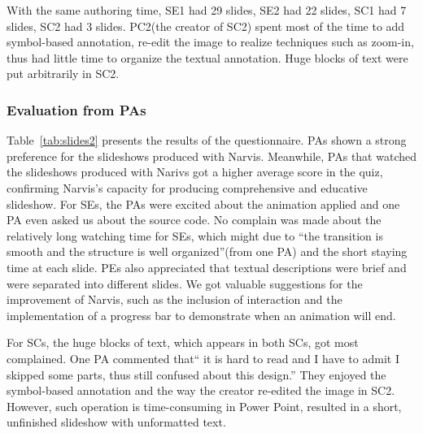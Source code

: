 With the same authoring time, SE1 had 29 slides, SE2 had 22 slides, SC1 had 7 slides, SC2 had 3 slides. PC2(the creator of SC2) spent most of the time to add symbol-based annotation, re-edit the image to realize techniques such as zoom-in, thus had little time to organize the textual annotation. Huge blocks of text were put arbitrarily in SC2.



\subsubsection{Evaluation from PAs}

Table~\ref{tab:slides2} presents the results of the questionnaire. PAs shown a strong preference for the slideshows produced with Narvis. Meanwhile,  PAs that watched the slideshows produced with Narivs got a higher average score in the quiz, confirming Narvis's capacity for producing comprehensive and educative slideshow. 
For SEs, the PAs were excited about the animation applied and one PA even asked us about the source code. No complain was made about the relatively long watching time for SEs, which might due to ``the transition is smooth and the structure is well organized''(from one PA) and the short staying time at each slide. PEs also appreciated that textual descriptions were brief and were separated into different slides.
We got valuable suggestions for the improvement of Narvis, such as the inclusion of interaction and the implementation of a progress bar to demonstrate when an animation will end. 

For SCs, the huge blocks of text, which appears in both SCs, got most complained. 
One PA commented that`` it is hard to read and I have to admit I skipped some parts, thus still confused about this design.'' They enjoyed the symbol-based annotation and the way the creator re-edited the image in SC2. However, such operation is time-consuming in Power Point, resulted in a short, unfinished slideshow with unformatted text. 


